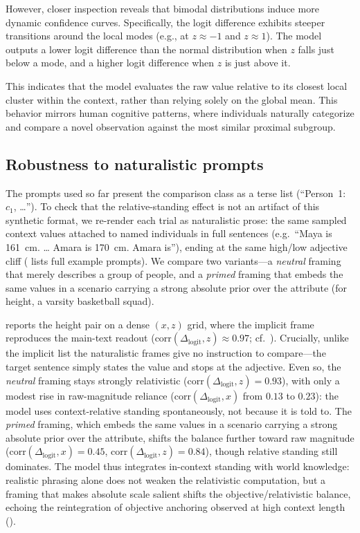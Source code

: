 \documentclass{article}
\newcommand{\logitdiff}{\ensuremath{\Delta_{\mathrm{logit}}}}
\begin{document}
However, closer inspection reveals that bimodal distributions induce more dynamic confidence curves. Specifically, the logit difference exhibits steeper transitions around the local modes (e.g., at $z \approx -1$ and $z \approx 1$). The model outputs a lower logit difference than the normal distribution when $z$ falls just below a mode, and a higher logit difference when $z$ is just above it.

This indicates that the model evaluates the raw value relative to its closest local cluster within the context, rather than relying solely on the global mean. This behavior mirrors human cognitive patterns, where individuals naturally categorize and compare a novel observation against the most similar proximal subgroup.


\subsection{Robustness to naturalistic prompts}
\label{subsec:sensitivity-realism}

The prompts used so far present the comparison class as a terse list (``Person~1: $c_1$, \dots'').
To check that the relative-standing effect is not an artifact of this synthetic format, we re-render
each trial as naturalistic prose: the same sampled context values attached to named individuals in
full sentences (e.g.\ ``Maya is 161~cm. \dots{} Amara is 170~cm. Amara
is''), ending at the same high/low adjective cliff ( lists full example prompts). We compare two variants---a \emph{neutral}
framing that merely describes a group of people, and a \emph{primed} framing that embeds the same
values in a scenario carrying a strong absolute prior over the attribute (for height, a varsity
basketball squad).

 reports the height pair on a dense $(x,z)$ grid, where the implicit frame
reproduces the main-text readout (corr$(\logitdiff,z)\approx0.97$; cf.\ ).
Crucially, unlike the implicit list the naturalistic frames give no instruction to compare---the
target sentence simply states the value and stops at the adjective. Even so, the \emph{neutral}
framing stays strongly relativistic (corr$(\logitdiff,z)=0.93$), with only a modest rise in
raw-magnitude reliance (corr$(\logitdiff,x)$ from $0.13$ to $0.23$): the model uses context-relative
standing spontaneously, not because it is told to. The \emph{primed} framing, which embeds the same
values in a scenario carrying a strong absolute prior over the attribute, shifts the balance further
toward raw magnitude (corr$(\logitdiff,x)=0.45$, corr$(\logitdiff,z)=0.84$), though relative standing
still dominates. The model thus integrates in-context standing with world knowledge: realistic
phrasing alone does not weaken the relativistic computation, but a framing that makes absolute scale
salient shifts the objective/relativistic balance, echoing the reintegration of objective anchoring
observed at high context length ().
\end{document}
